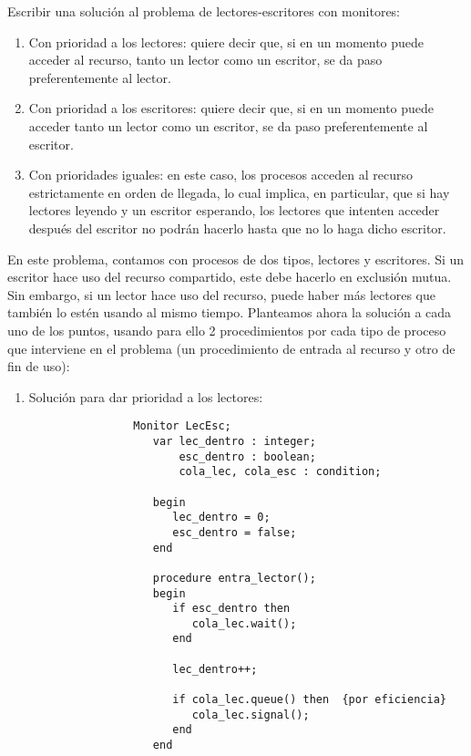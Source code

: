 \begin{ejercicio}
    Escribir una solución al problema de lectores-escritores con monitores:
    \begin{enumerate}
        \item Con prioridad a los lectores: quiere decir que, si en un momento puede acceder al recurso, tanto un lector como un escritor, se da paso preferentemente al lector.
        \item Con prioridad a los escritores: quiere decir que, si en un momento puede acceder tanto un lector como un escritor, se da paso preferentemente al escritor.
        \item Con prioridades iguales: en este caso, los procesos acceden al recurso estrictamente en orden de llegada, lo cual implica, en particular, que si hay lectores leyendo y un escritor esperando, los lectores que intenten acceder después del escritor no podrán hacerlo hasta que no lo haga dicho escritor.
    \end{enumerate}
    En este problema, contamos con procesos de dos tipos, lectores y escritores. Si un escritor hace uso del recurso compartido, este debe hacerlo en exclusión mutua. Sin embargo, si un lector hace uso del recurso, puede haber más lectores que también lo estén usando al mismo tiempo.
    Planteamos ahora la solución a cada uno de los puntos, usando para ello 2 procedimientos por cada tipo de proceso que interviene en el problema (un procedimiento de entrada al recurso y otro de fin de uso):
    \begin{enumerate}
        \item Solución para dar prioridad a los lectores:
            \begin{verbatim}
                Monitor LecEsc;
                   var lec_dentro : integer;
                       esc_dentro : boolean;
                       cola_lec, cola_esc : condition;

                   begin
                      lec_dentro = 0;
                      esc_dentro = false;
                   end

                   procedure entra_lector();
                   begin
                      if esc_dentro then
                         cola_lec.wait();
                      end

                      lec_dentro++;

                      if cola_lec.queue() then  {por eficiencia}
                         cola_lec.signal();
                      end
                   end


\end{verbatim}
\end{enumerate}
\end{ejercicio}
